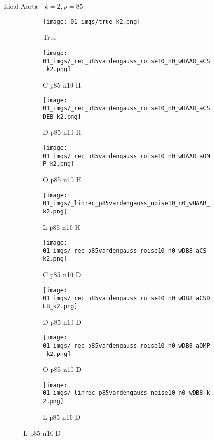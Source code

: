 \begin{frame}{Ideal Aorta - $k=2,p=85$}{}
\begin{figure}
\begin{subfigure}{0.1\textwidth}
\texttt{[image: 01\_imgs/true\_k2.png]}
\caption*{\Tiny True}
\end{subfigure}
\begin{subfigure}{0.1\textwidth}
\texttt{[image: 01\_imgs/\_rec\_p85vardengauss\_noise10\_n0\_wHAAR\_aCS\_k2.png]}
\caption*{\Tiny C p85 n10 H}
\end{subfigure}
\begin{subfigure}{0.1\textwidth}
\texttt{[image: 01\_imgs/\_rec\_p85vardengauss\_noise10\_n0\_wHAAR\_aCSDEB\_k2.png]}
\caption*{\Tiny D p85 n10 H}
\end{subfigure}
\begin{subfigure}{0.1\textwidth}
\texttt{[image: 01\_imgs/\_rec\_p85vardengauss\_noise10\_n0\_wHAAR\_aOMP\_k2.png]}
\caption*{\Tiny O p85 n10 H}
\end{subfigure}
\begin{subfigure}{0.1\textwidth}
\texttt{[image: 01\_imgs/\_linrec\_p85vardengauss\_noise10\_n0\_wHAAR\_k2.png]}
\caption*{\Tiny L p85 n10 H}
\end{subfigure}
\begin{subfigure}{0.1\textwidth}
\texttt{[image: 01\_imgs/\_rec\_p85vardengauss\_noise10\_n0\_wDB8\_aCS\_k2.png]}
\caption*{\Tiny C p85 n10 D}
\end{subfigure}
\begin{subfigure}{0.1\textwidth}
\texttt{[image: 01\_imgs/\_rec\_p85vardengauss\_noise10\_n0\_wDB8\_aCSDEB\_k2.png]}
\caption*{\Tiny D p85 n10 D}
\end{subfigure}
\begin{subfigure}{0.1\textwidth}
\texttt{[image: 01\_imgs/\_rec\_p85vardengauss\_noise10\_n0\_wDB8\_aOMP\_k2.png]}
\caption*{\Tiny O p85 n10 D}
\end{subfigure}
\begin{subfigure}{0.1\textwidth}
\texttt{[image: 01\_imgs/\_linrec\_p85vardengauss\_noise10\_n0\_wDB8\_k2.png]}
\caption*{\Tiny L p85 n10 D}
\end{subfigure}

\vspace{5pt}


\end{figure}
\end{frame}
